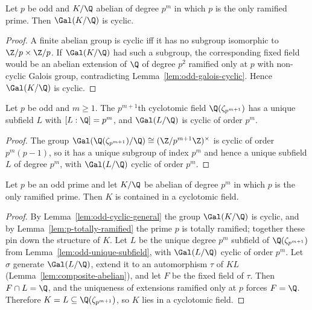 \begin{lemma}
  \label{lem:odd-cyclic-general}
  Let $p$ be odd and $K/\Q$ abelian of degree $p^m$ in which $p$ is the only
  ramified prime. Then $\Gal(K/\Q)$ is cyclic.
\end{lemma}
\begin{proof}
  A finite abelian group is cyclic iff it has no subgroup isomorphic to
  $\Z/p \times \Z/p$. If $\Gal(K/\Q)$ had such a subgroup, the corresponding
  fixed field would be an abelian extension of $\Q$ of degree $p^2$ ramified
  only at $p$ with non-cyclic Galois group, contradicting
  Lemma~\ref{lem:odd-galois-cyclic}. Hence $\Gal(K/\Q)$ is cyclic.
\end{proof}

\begin{lemma}
  \label{lem:odd-unique-subfield}
  \leanok
  Let $p$ be odd and $m \ge 1$. The $p^{m+1}$th cyclotomic field
  $\Q(\zeta_{p^{m+1}})$ has a unique subfield $L$ with $[L : \Q] = p^m$, and
  $\Gal(L/\Q)$ is cyclic of order $p^m$.
\end{lemma}
\begin{proof}
  The group $\Gal(\Q(\zeta_{p^{m+1}})/\Q) \cong (\Z/p^{m+1}\Z)^\times$ is cyclic
  of order $p^m(p-1)$, so it has a unique subgroup of index $p^m$ and hence a
  unique subfield $L$ of degree $p^m$, with $\Gal(L/\Q)$ cyclic of order $p^m$.
\end{proof}

\begin{theorem}
  \label{thm:case-odd-p}
  Let $p$ be an odd prime and let $K/\Q$ be abelian of degree $p^m$ in which
  $p$ is the only ramified prime. Then $K$ is contained in a cyclotomic field.
\end{theorem}
\begin{proof}
  By Lemma~\ref{lem:odd-cyclic-general} the group $\Gal(K/\Q)$ is cyclic, and by
  Lemma~\ref{lem:p-totally-ramified} the prime $p$ is totally ramified; together
  these pin down the structure of $K$. Let $L$ be the unique degree $p^m$
  subfield of $\Q(\zeta_{p^{m+1}})$ from Lemma~\ref{lem:odd-unique-subfield},
  with $\Gal(L/\Q)$ cyclic of order $p^m$.
  Let $\sigma$ generate $\Gal(L/\Q)$, extend it to an automorphism $\tau$ of
  $KL$ (Lemma~\ref{lem:composite-abelian}), and let $F$ be the fixed field of
  $\tau$. Then $F \cap L = \Q$, and the uniqueness of extensions ramified only
  at $p$ forces $F = \Q$. Therefore $K = L \subseteq \Q(\zeta_{p^{m+1}})$, so
  $K$ lies in a cyclotomic field.
\end{proof}
